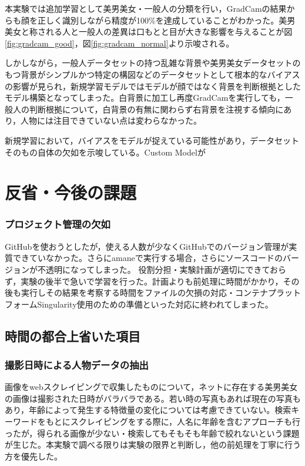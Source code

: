 \documentclass[a4paper,11pt,titlepage]{jsarticle}
\begin{document}
本実験では追加学習として美男美女・一般人の分類を行い，GradCamの結果からも顔を正しく識別しながら精度が100\%を達成していることがわかった。美男美女と称される人と一般人の差異は口もとと目が大きな影響を与えることが図\ref{fig:gradcam_good}，図\ref{fig:gradcam_normal}より示唆される。



しかしながら，一般人データセットの持つ乱雑な背景や美男美女データセットのもつ背景がシンプルかつ特定の構図などのデータセットとして根本的なバイアスの影響が見られ，新規学習モデルではモデルが顔ではなく背景を判断根拠としたモデル構築となってしまった。白背景に加工し再度GradCamを実行しても，一般人の判断根拠について，白背景の有無に関わらず右背景を注視する傾向にあり，人物には注目できていない点は変わらなかった。

新規学習において，バイアスをモデルが捉えている可能性があり，データセットそのもの自体の欠如を示唆している。Custom Modelが


\section{反省・今後の課題}
\subsubsection{プロジェクト管理の欠如}

GitHubを使おうとしたが，使える人数が少なくGitHubでのバージョン管理が実質できていなかった。さらにamaneで実行する場合，さらにソースコードのバージョンが不透明になってしまった。
役割分担・実験計画が適切にできておらず，実験の後半で急いで学習を行った。計画よりも前処理に時間がかかり，その後も実行しその結果を考察する時間をファイルの欠損の対応・コンテナプラットフォームSingularity使用のための準備といった対応に終われてしまった。

\subsection{時間の都合上省いた項目}
\subsubsection{撮影日時による人物データの抽出}
画像をwebスクレイピングで収集したものについて，ネットに存在する美男美女の画像は撮影された日時がバラバラである。若い時の写真もあれば現在の写真もあり，年齢によって発生する特徴量の変化については考慮できていない。検索キーワードをもとにスクレイピングをする際に，人名に年齢を含むアプローチも行ったが，得られる画像が少ない・検索してもそもそも年齢で絞れないという課題が生じた。本実験で調べる限りは実験の限界と判断し，他の前処理を丁寧に行う方を優先した。
\end{document}

